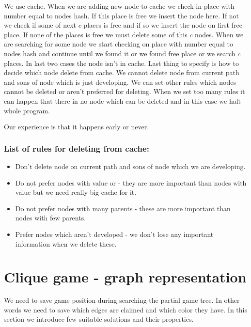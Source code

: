 We use  cache. When we are adding new node to
cache we check in place with number equal to nodes hash. If this place is free
we insert the node here. If not we check if some of next $c$ places is free and
if so we insert the node on first free place. If none of the places is free we
must delete some of this $c$ nodes. When we are searching for some node we
start checking on place with number equal to nodes hash and continue until we
found it or we found free place or we search $c$ places. In last two cases the
node isn't in cache. Last thing to specify is how to decide which node delete
from cache. We cannot delete node from current path and sons of node which is
just developing. We can set other rules which nodes cannot be deleted or aren't
preferred for deleting. When we set too many rules it can happen that there in
no node which can be deleted and in this case we halt whole program. 

Our experience is that it happens early or never.

\subsubsection{List of rules for deleting from cache:}
\begin{itemize}
\item Don't delete node on current path and sons of node which we are developing.
\item Do not prefer nodes with value \value{true} or \value{false} - they are 
      more important than nodes with value \value{unknown} but we need really big
      cache for it.
\item Do not prefer nodes with many parents - these are more important than nodes
      with few parents.
\item Prefer nodes which aren't developed - we don't lose any important information
      when we delete these. 
\end{itemize}

\section{Clique game - graph representation }

We need to save game position during searching the partial game tree. In other words we
need to save which edges are claimed and which color they have. In
this section we introduce few suitable solutions and their properties.

